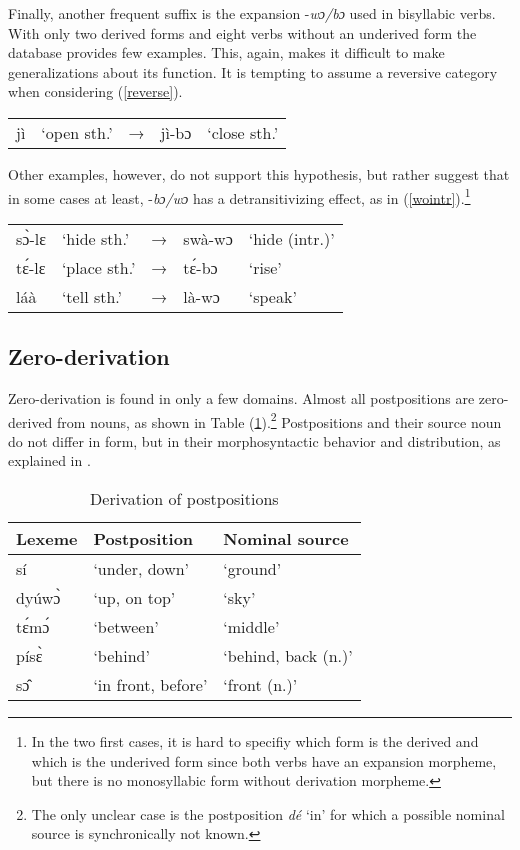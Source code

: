 Finally, another frequent suffix is the expansion -{\itshape wɔ/bɔ} used in bisyllabic verbs. With only two derived forms and eight verbs without an underived form the database provides few examples. This, again, makes it difficult to make generalizations about its function. It is tempting to assume a reversive category when considering (\ref{reverse}). 


\begin{exe} \ex \label{reverse}
\begin{tabular}{llllp{4cm}}
jì & `open sth.' & → & jì-bɔ & `close sth.' \\
\end{tabular}
\end{exe}

Other examples, however, do not support this hypothesis, but rather suggest that in some cases at least, -{\itshape bɔ/wɔ} has a detransitivizing effect, as in (\ref{wointr}).\footnote{In the two first cases, it is hard to specifiy which form is the derived and which is the underived form since both verbs have an expansion morpheme, but there is no monosyllabic form without derivation morpheme.}


\begin{exe} \ex \label{wointr}
\begin{tabular}{llllp{4cm}}
sɔ̀-lɛ & `hide sth.' & → & swà-wɔ & `hide (intr.)' \\
tɛ́-lɛ & `place sth.' & → & tɛ́-bɔ & `rise' \\
láà & `tell sth.' & → & là-wɔ & `speak' \\
\end{tabular}
\end{exe}


\subsection{Zero-derivation}
\label{sec:ZeroDer}

Zero-derivation is found in only a few domains.
Almost all postpositions are zero-derived from nouns, as shown in Table (\ref{Tab:ZeroDeriv1}).\footnote{The only unclear case is the postposition {\itshape dé} `in' for which a possible nominal source is synchronically not known.} Postpositions and their source noun do not differ in form, but in their morphosyntactic behavior and distribution, as explained in .

\begin{table} 
\centering
\begin{tabular}{lll}
Lexeme & Postposition & Nominal source \\  \midrule
sí & `under, down' & `ground' \\
 dyúwɔ̀ &  `up, on top' & `sky' \\
tɛ́mɔ́ &  `between' & `middle' \\
písɛ̀ &   `behind' & `behind, back (n.)' \\
sɔ̂ & `in front, before' & `front (n.)' \\
\end{tabular}
\caption{Derivation of postpositions}
\label{Tab:ZeroDeriv1}
\end{table}

